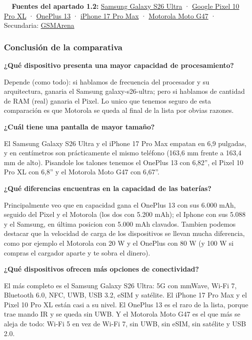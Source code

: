 \documentclass[11pt,a4paper]{article}
\newcommand{\campo}[1]{\textbf{\color{ink}#1}}
\begin{document}
	\begin{fuentesbox}
		\textbf{\color{muted}\faBook\ \ Fuentes del apartado 1.2:}
		\href{https://www.samsung.com/es/smartphones/galaxy-s26-ultra/}{Samsung Galaxy S26 Ultra} ·
		\href{https://store.google.com/product/pixel_10_pro_specs}{Google Pixel 10 Pro XL} ·
		\href{https://www.oneplus.com/es/13/specs}{OnePlus 13} ·
		\href{https://support.apple.com/es-es/125091}{iPhone 17 Pro Max} ·
		\href{https://www.motorola.com/sa/en/p/phones/moto-g/47/pmipmjs44mz}{Motorola Moto G47} ·
		Secundaria: \href{https://www.gsmarena.com/}{GSMArena}
	\end{fuentesbox}
	
	\subsubsection*{Conclusión de la comparativa}
	
	\campo{¿Qué dispositivo presenta una mayor capacidad de procesamiento?}
	
	Depende (como todo): si hablamos de frecuencia del procesador y su arquitectura, ganaria el Samsung galaxy-s26-ultra; pero si hablamos de cantidad de RAM (real) ganaria el Pixel. Lo unico que tenemos seguro de esta comparación es que Motorola se queda al final de la lista por obvias razones.
	
	\campo{¿Cuál tiene una pantalla de mayor tamaño?}
	
	El Samsung Galaxy S26 Ultra y el iPhone 17 Pro Max empatan en 6,9 pulgadas, y en centímetros son prácticamente el mismo teléfono (163,6 mm frente a 163,4 mm de alto). Pisandole los talones tenemos el OnePlus 13 con 6,82'', el Pixel 10 Pro XL con 6,8'' y el Motorola Moto G47 con 6,67''.
	
	\campo{¿Qué diferencias encuentras en la capacidad de las baterías?}
	
	Principalmente veo que en capacidad gana el OnePlus 13 con sus 6.000 mAh, seguido del Pixel y el Motorola (los dos con 5.200 mAh); el Iphone con sus 5.088 y el Samsung, en última posicion con 5.000 mAh clavados. Tambien podemos destacar que la velocidad de carga de los dispositivos se llevan mucha diferencia, como por ejemplo el Motorola con 20 W y el OnePlus con 80 W (y 100 W si compras el cargador aparte y te sobra el dinero).
	
	\campo{¿Qué dispositivos ofrecen más opciones de conectividad?}
	
	El más completo es el Samsung Galaxy S26 Ultra: 5G con mmWave, Wi-Fi 7, Bluetooth 6.0, NFC, UWB, USB 3.2, eSIM y satélite. El iPhone 17 Pro Max y el Pixel 10 Pro XL están casi a su nivel. El OnePlus 13 es el raro de la lista, porque trae mando IR y se queda sin UWB. Y el Motorola Moto G47 es el que más se aleja de todo: Wi-Fi 5 en vez de Wi-Fi 7, sin UWB, sin eSIM, sin satélite y USB 2.0.
	
\end{document}
